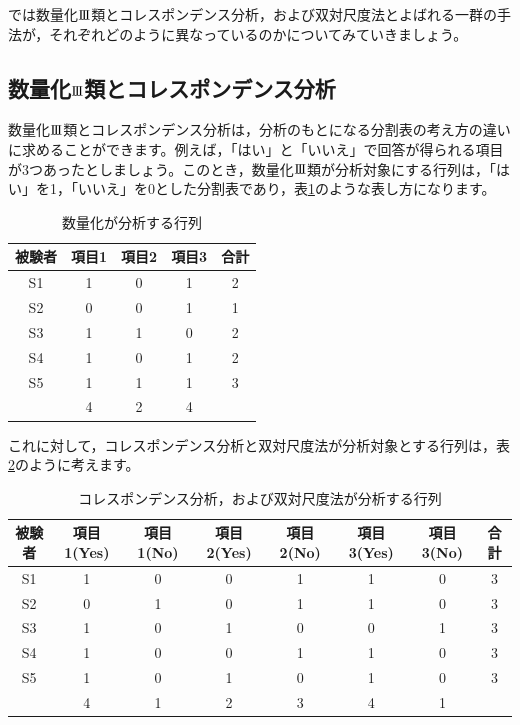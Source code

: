 \documentclass{ltjsbook}
\begin{document}
では数量化$\mathrm{I}\hspace{-1.2pt}\mathrm{I}\hspace{-1.2pt}\mathrm{I}$類とコレスポンデンス分析，および双対尺度法とよばれる一群の手法が，それぞれどのように異なっているのかについてみていきましょう。

\subsection{数量化$\mathrm{I}\hspace{-1.2pt}\mathrm{I}\hspace{-1.2pt}\mathrm{I}$類とコレスポンデンス分析}
数量化$\mathrm{I}\hspace{-1.2pt}\mathrm{I}\hspace{-1.2pt}\mathrm{I}$類とコレスポンデンス分析は，分析のもとになる分割表の考え方の違いに求めることができます。例えば，「はい」と「いいえ」で回答が得られる項目が3つあったとしましょう。このとき，数量化$\mathrm{I}\hspace{-1.2pt}\mathrm{I}\hspace{-1.2pt}\mathrm{I}$類が分析対象にする行列は，「はい」を1，「いいえ」を0とした分割表であり，表\ref{hayashi}のような表し方になります。
\begin{table}[ht]
    \begin{center}
        \caption{数量化が分析する行列}
        \begin{tabular}{c|ccc|c}
            被験者 & 項目1 & 項目2 & 項目3 & 合計 \\
            \hline
            S1  & 1   & 0   & 1   & 2  \\
            S2  & 0   & 0   & 1   & 1  \\
            S3  & 1   & 1   & 0   & 2  \\
            S4  & 1   & 0   & 1   & 2  \\
            S5  & 1   & 1   & 1   & 3  \\
            \hline
                & 4   & 2   & 4   &    \\
        \end{tabular}
        \label{hayashi}
    \end{center}
\end{table}

これに対して，コレスポンデンス分析と双対尺度法が分析対象とする行列は，表\ref{corepon}のように考えます。
\begin{table}[ht]
    \begin{center}
        \caption{コレスポンデンス分析，および双対尺度法が分析する行列}
        \begin{tabular}{c|cccccc|c}
            被験者 & 項目1(Yes) & 項目1(No) & 項目2(Yes) & 項目2(No) & 項目3(Yes) & 項目3(No) & 合計 \\
            \hline
            S1  & 1        & 0       & 0        & 1       & 1        & 0        & 3  \\
            S2  & 0        & 1       & 0        & 1       & 1        & 0        & 3  \\
            S3  & 1        & 0       & 1        & 0       & 0        & 1        & 3  \\
            S4  & 1        & 0       & 0        & 1       & 1        & 0        & 3  \\
            S5  & 1        & 0       & 1        & 0       & 1        & 0        & 3  \\
            \hline
                & 4        & 1       & 2        & 3       & 4        & 1        &    \\
        \end{tabular}
        \label{corepon}
    \end{center}
\end{table}
\end{document}
